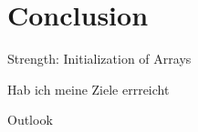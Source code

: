 \chapter{Conclusion}\label{chap:conclusion}

Strength: Initialization of Arrays

Hab ich meine Ziele errreicht

Outlook